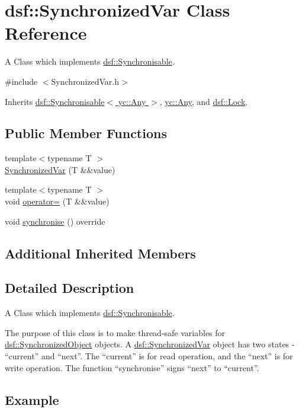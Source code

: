 \hypertarget{classdsf_1_1_synchronized_var}{}\section{dsf\+:\+:Synchronized\+Var Class Reference}
\label{classdsf_1_1_synchronized_var}


A Class which implements \hyperlink{classdsf_1_1_synchronisable}{dsf\+::\+Synchronisable}.  




{\ttfamily \#include $<$Synchronized\+Var.\+h$>$}



Inherits \hyperlink{classdsf_1_1_synchronisable}{dsf\+::\+Synchronisable$<$ yc\+::\+Any $>$}, \hyperlink{classyc_1_1_any}{yc\+::\+Any}, and \hyperlink{classdsf_1_1_lock}{dsf\+::\+Lock}.

\subsection*{Public Member Functions}
\begin{DoxyCompactItemize}
\item 
{\footnotesize template$<$typename T $>$ }\\\hyperlink{classdsf_1_1_synchronized_var_aada6540bf8bbbf1451834f31aad0962f}{Synchronized\+Var} (T \&\&value)
\item 
{\footnotesize template$<$typename T $>$ }\\void \hyperlink{classdsf_1_1_synchronized_var_a8b72cc04251d677755090bd9b834291c}{operator=} (T \&\&value)
\item 
void \hyperlink{classdsf_1_1_synchronized_var_ac8465a885c4dbb5bc5ca9ad25f42c3ec}{synchronise} () override
\end{DoxyCompactItemize}
\subsection*{Additional Inherited Members}


\subsection{Detailed Description}
A Class which implements \hyperlink{classdsf_1_1_synchronisable}{dsf\+::\+Synchronisable}. 

The purpose of this class is to make thread-\/safe variables for \hyperlink{classdsf_1_1_synchronized_object}{dsf\+::\+Synchronized\+Object} objects. A \hyperlink{classdsf_1_1_synchronized_var}{dsf\+::\+Synchronized\+Var} object has two states -\/ “current” and “next”. The “current” is for read operation, and the “next” is for write operation. The function “synchronise” signs “next” to “current”.\hypertarget{classdsf_1_1_synchronized_var_Example}{}\subsection{Example}\label{classdsf_1_1_synchronized_var_Example}

